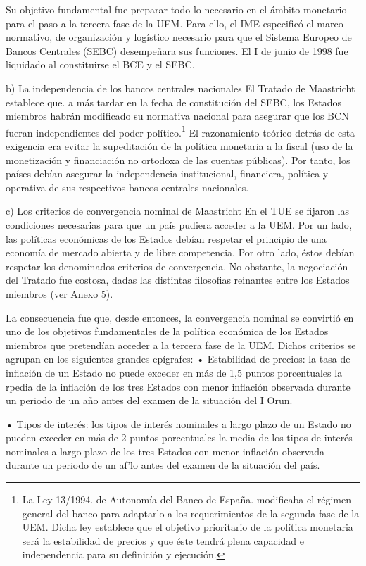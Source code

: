 \documentclass[10pt,a4paper]{article}
\begin{document}
Su objetivo fundamental fue preparar todo lo necesario en el ámbito monetario para el paso a la tercera fase de la UEM. Para ello, el IME especificó el marco normativo, de organización y logístico necesario para que el Sistema Europeo de Bancos Centrales (SEBC) desempeñara sus funciones. El I de junio de 1998 fue liquidado al constituirse el BCE y el SEBC.

b) La independencia de los bancos centrales nacionales
El Tratado de Maastricht establece que. a más tardar en la fecha de constitución del SEBC, los Estados miembros habrán modificado su normativa nacional para asegurar que los BCN fueran independientes del poder político.\footnote{%
    La Ley 13/1994. de Autonomía del Banco de España. modificaba el régimen general del banco para adaptarlo a los requerimientos de la segunda fase de la UEM. Dicha ley establece que el objetivo prioritario de la política monetaria será la estabilidad de precios y que éste tendrá plena capacidad e independencia para su definición y ejecución.
} El razonamiento teórico detrás de esta exigencia era evitar la supeditación de la política monetaria a la fiscal (uso de la monetización y financiación no ortodoxa de las cuentas públicas). Por tanto, los países debían asegurar la independencia institucional, financiera, política y operativa de sus respectivos bancos centrales nacionales.

c) Los criterios de convergencia nominal de Maastricht 
En el TUE se fijaron las condiciones necesarias para que un país pudiera acceder a la UEM. Por un lado, las políticas económicas de los Estados debían respetar el principio de una economía de mercado abierta y de libre competencia. Por otro lado, éstos debían respetar los denominados criterios de convergencia. No obstante, la negociación del Tratado fue costosa, dadas las distintas filosofias reinantes entre los Estados miembros (ver Anexo 5). 

La consecuencia fue que, desde entonces, la convergencia nominal se convirtió en uno de los objetivos fundamentales de la política económica de los Estados miembros que pretendían acceder a la tercera fase de la UEM. Dichos criterios se agrupan en los siguientes grandes epígrafes: • Estabilidad de precios: la tasa de inflación de un Estado no puede exceder en más de 1,5 puntos porcentuales la rpedia de la inflación de los tres Estados con menor inflación  observada durante un periodo de un año antes del examen de la situación del I Orun. 

• Tipos de interés: los tipos de interés nominales a largo plazo de un Estado no pueden exceder en más de 2 puntos porcentuales la media de los tipos de interés nominales a largo plazo de los tres Estados con menor inflación observada durante un periodo de un af'lo antes del examen de la situación del país. 
\end{document}
